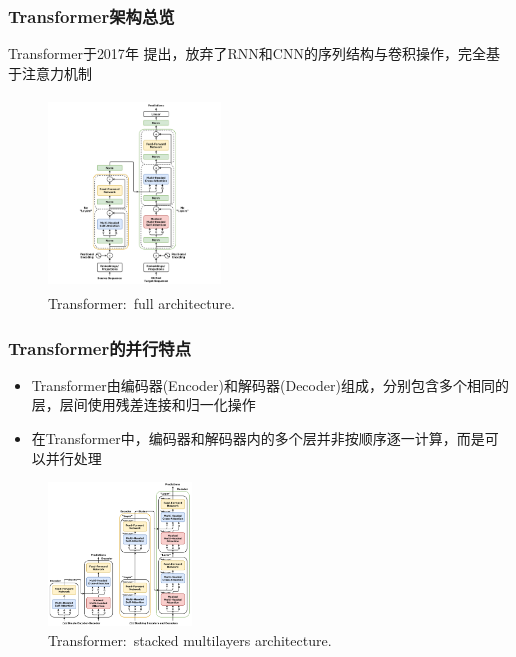 \begin{frame}
	\frametitle{\textrm{Transformer}架构总览}
	\textrm{Transformer}于\textrm{2017}年%
    提出，放弃了\textrm{RNN}和\textrm{CNN}的序列结构与卷积操作，完全基于注意力机制\\
    {\fontsize{7.2pt}{6.2pt}}
\begin{figure}[h!]
\centering
\includegraphics[height=2.0in, width=1.8in, viewport=300 0 1200 1500,clip]{Figures/Transformer_full_architecture.png}
\caption{\tiny \textrm{Transformer:~full architecture.}}%
\label{Transformer_full_architecture}
\end{figure}
\end{frame}

\begin{frame}
	\frametitle{\textrm{Transformer}的并行特点}
\begin{itemize}
	\item \textrm{Transformer}由编码器\textrm{(Encoder)}和解码器\textrm{(Decoder)}组成，分别包含多个相同的层，层间使用残差连接和归一化操作\\
    {\fontsize{7.2pt}{6.2pt}\selectfont{这样的模块设计，为并行计算提供了基础}}
    \item 在\textrm{Transformer}中，编码器和解码器内的多个层并非按顺序逐一计算，而是可以并行处理\\
	    {\fontsize{7.2pt}{6.2pt}\selectfont{在编码器中每个编码器层相互独立，在计算时，所有编码器层可以同时处理输入数据的不同部分，大幅提升计算效率}}
\end{itemize}
\begin{figure}[h!]
\vspace*{-0.05in}
\centering
\includegraphics[height=1.5in, width=1.5in, viewport=0 0 1426 1430,clip]{Figures/Transformer_stacked_multilayers.png}
\caption{\tiny \textrm{Transformer:~stacked multilayers architecture.}}%
\label{Transformer_stacked_multilayers}
\end{figure}
\end{frame}

